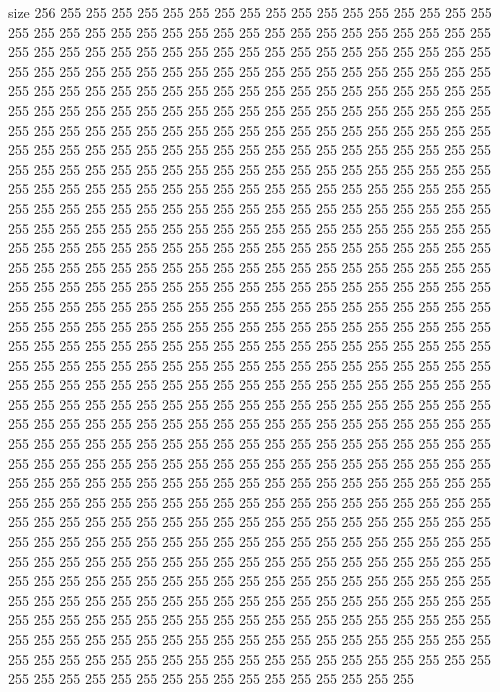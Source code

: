 size 256
255 255 255 255 255 255 255 255 255 255 255 255 255 255 255 255 255 255 255 255
255 255 255 255 255 255 255 255 255 255 255 255 255 255 255 255 255 255 255 255
255 255 255 255 255 255 255 255 255 255 255 255 255 255 255 255 255 255 255 255
255 255 255 255 255 255 255 255 255 255 255 255 255 255 255 255 255 255 255 255
255 255 255 255 255 255 255 255 255 255 255 255 255 255 255 255 255 255 255 255
255 255 255 255 255 255 255 255 255 255 255 255 255 255 255 255 255 255 255 255
255 255 255 255 255 255 255 255 255 255 255 255 255 255 255 255 255 255 255 255
255 255 255 255 255 255 255 255 255 255 255 255 255 255 255 255 255 255 255 255
255 255 255 255 255 255 255 255 255 255 255 255 255 255 255 255 255 255 255 255
255 255 255 255 255 255 255 255 255 255 255 255 255 255 255 255 255 255 255 255
255 255 255 255 255 255 255 255 255 255 255 255 255 255 255 255 255 255 255 255
255 255 255 255 255 255 255 255 255 255 255 255 255 255 255 255 255 255 255 255
255 255 255 255 255 255 255 255 255 255 255 255 255 255 255 255 255 255 255 255
255 255 255 255 255 255 255 255 255 255 255 255 255 255 255 255 255 255 255 255
255 255 255 255 255 255 255 255 255 255 255 255 255 255 255 255 255 255 255 255
255 255 255 255 255 255 255 255 255 255 255 255 255 255 255 255 255 255 255 255
255 255 255 255 255 255 255 255 255 255 255 255 255 255 255 255 255 255 255 255
255 255 255 255 255 255 255 255 255 255 255 255 255 255 255 255 255 255 255 255
255 255 255 255 255 255 255 255 255 255 255 255 255 255 255 255 255 255 255 255
255 255 255 255 255 255 255 255 255 255 255 255 255 255 255 255 255 255 255 255
255 255 255 255 255 255 255 255 255 255 255 255 255 255 255 255 255 255 255 255
255 255 255 255 255 255 255 255 255 255 255 255 255 255 255 255 255 255 255 255
255 255 255 255 255 255 255 255 255 255 255 255 255 255 255 255 255 255 255 255
255 255 255 255 255 255 255 255 255 255 255 255 255 255 255 255 255 255 255 255
255 255 255 255 255 255 255 255 255 255 255 255 255 255 255 255 255 255 255 255
255 255 255 255 255 255 255 255 255 255 255 255 255 255 255 255 255 255 255 255
255 255 255 255 255 255 255 255 255 255 255 255 255 255 255 255 255 255 255 255
255 255 255 255 255 255 255 255 255 255 255 255 255 255 255 255 255 255 255 255
255 255 255 255 255 255 255 255 255 255 255 255 255 255 255 255 255 255 255 255
255 255 255 255 255 255 255 255 255 255 255 255 255 255 255 255 255 255 255 255
255 255 255 255 255 255 255 255 255 255 255 255 255 255 255 255 255 255 255 255
255 255 255 255 255 255 255 255 255 255 255 255 255 255 255 255 255 255 255 255
255 255 255 255 255 255 255 255 255 255 255 255 255 255 255 255 255 255 255 255
